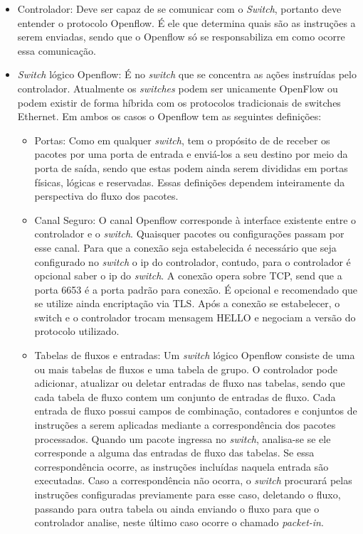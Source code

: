 \begin{itemize}
    \item Controlador: Deve ser capaz de se comunicar com o \textit{Switch}, portanto deve entender o protocolo Openflow. É ele que determina quais são as instruções a serem enviadas, sendo que o Openflow só se responsabiliza em como ocorre essa comunicação.
    \item \textit{Switch} lógico Openflow: É no \textit{switch} que se concentra as ações instruídas pelo controlador. Atualmente os \textit{switches} podem ser unicamente OpenFlow ou podem existir de forma híbrida com os protocolos tradicionais de switches Ethernet. Em ambos os casos o Openflow tem as seguintes definições:
        \begin{itemize}
            \item Portas: Como em qualquer \textit{switch}, tem o propósito de de receber os pacotes por uma porta de entrada e enviá-los a seu destino por meio da porta de saída, sendo que estas podem ainda serem divididas em portas físicas, lógicas e reservadas. Essas definições dependem inteiramente da perspectiva do fluxo dos pacotes.
            \item Canal Seguro: O canal Openflow corresponde à interface existente entre o controlador e o \textit{switch}. Quaisquer pacotes ou configurações passam por esse canal. Para que a conexão seja estabelecida é necessário que seja configurado no \textit{switch} o ip do controlador, contudo, para o controlador é opcional saber  o ip do \textit{switch}. A conexão opera sobre TCP, send que a porta 6653 é a porta padrão para conexão. É opcional e recomendado que se utilize ainda encriptação via TLS. Após a conexão se estabelecer, o switch e o controlador trocam mensagem HELLO e negociam a versão do protocolo utilizado. 
            \item Tabelas de fluxos e entradas: Um \textit{switch} lógico Openflow consiste de uma ou mais tabelas de fluxos e uma tabela de grupo. O controlador pode adicionar, atualizar ou deletar entradas de fluxo nas tabelas, sendo que cada tabela de fluxo contem um conjunto de entradas de fluxo. Cada entrada de fluxo possui campos de combinação, contadores e conjuntos de instruções a serem aplicadas mediante a correspondência dos pacotes processados.
            Quando um pacote ingressa no \textit{switch}, analisa-se se ele corresponde a alguma das entradas de fluxo das tabelas. Se essa correspondência ocorre, as instruções incluídas naquela entrada são executadas. Caso a correspondência não ocorra, o \textit{switch} procurará pelas instruções configuradas previamente para esse caso, deletando o fluxo, passando para outra tabela ou ainda enviando o fluxo para que o controlador analise, neste último caso ocorre o chamado \textit{packet-in}.
            

\end{itemize}
\end{itemize}
